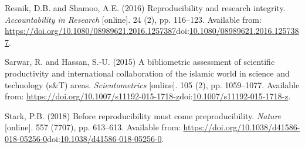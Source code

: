 \documentclass[]{article}
\begin{document}
\leavevmode\hypertarget{ref-Resnik2016}{}%
Resnik, D.B. and Shamoo, A.E. (2016) Reproducibility and research
integrity. \emph{Accountability in Research} {[}online{]}. 24 (2), pp.
116--123. Available from:
\url{https://doi.org/10.1080/08989621.2016.1257387}doi:\href{https://doi.org/10.1080/08989621.2016.1257387}{10.1080/08989621.2016.1257387}.

\leavevmode\hypertarget{ref-Sarwar2015}{}%
Sarwar, R. and Hassan, S.-U. (2015) A bibliometric assessment of
scientific productivity and international collaboration of the islamic
world in science and technology (s\&T) areas. \emph{Scientometrics}
{[}online{]}. 105 (2), pp. 1059--1077. Available from:
\url{https://doi.org/10.1007/s11192-015-1718-z}doi:\href{https://doi.org/10.1007/s11192-015-1718-z}{10.1007/s11192-015-1718-z}.

\leavevmode\hypertarget{ref-Stark2018}{}%
Stark, P.B. (2018) Before reproducibility must come preproducibility.
\emph{Nature} {[}online{]}. 557 (7707), pp. 613--613. Available from:
\url{https://doi.org/10.1038/d41586-018-05256-0}doi:\href{https://doi.org/10.1038/d41586-018-05256-0}{10.1038/d41586-018-05256-0}.
\end{document}
